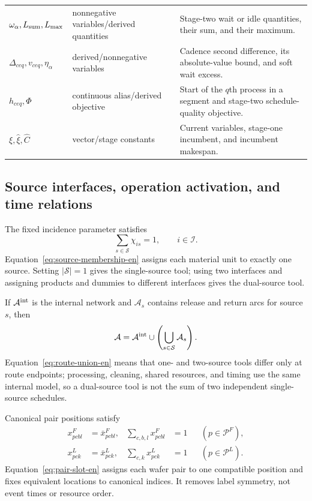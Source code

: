\documentclass[final,5p,times,twocolumn]{elsarticle}
\begin{document}
\begin{table}[t]
\begin{tabular}{p{}p{}p{}}
$\omega_\alpha,L_{\rm sum},L_{\max}$ & nonnegative variables/derived quantities & Stage-two wait or idle quantities, their sum, and their maximum.\\
$\Delta_{ceq},v_{ceq},\eta_\alpha$ & derived/nonnegative variables & Cadence second difference, its absolute-value bound, and soft wait excess.\\
$h_{ceq},\Phi$ & continuous alias/derived objective & Start of the $q$th process in a segment and stage-two schedule-quality objective.\\
$\xi,\widehat\xi,\widehat C$ & vector/stage constants & Current variables, stage-one incumbent, and incumbent makespan.\\
\bottomrule
\end{tabular}
\end{table}

\subsection{Source interfaces, operation activation, and time relations}

The fixed incidence parameter satisfies
\begin{equation}
\sum_{s\in\mathcal S}\chi_{is}=1,
\qquad i\in\mathcal I.
\label{eq:source-membership-en}
\end{equation}
Equation~\eqref{eq:source-membership-en} assigns each material unit to exactly one source. Setting $|\mathcal S|=1$ gives the single-source tool; using two interfaces and assigning products and dummies to different interfaces gives the dual-source tool.

If $\mathcal A^{\rm int}$ is the internal network and $\mathcal A_s$ contains release and return arcs for source $s$, then
\begin{equation}
\mathcal A=\mathcal A^{\rm int}\cup
\left(\bigcup_{s\in\mathcal S}\mathcal A_s\right).
\label{eq:route-union-en}
\end{equation}
Equation~\eqref{eq:route-union-en} means that one- and two-source tools differ only at route endpoints; processing, cleaning, shared resources, and timing use the same internal model, so a dual-source tool is not the sum of two independent single-source schedules.

Canonical pair positions satisfy
\begin{equation}
\begin{aligned}
x^F_{pcbl}&=\bar x^F_{pcbl}, &
\sum_{c,b,l}x^F_{pcbl}&=1 &&(p\in\mathcal P^F),\\
x^L_{pck}&=\bar x^L_{pck}, &
\sum_{c,k}x^L_{pck}&=1 &&(p\in\mathcal P^L).
\end{aligned}
\label{eq:pair-slot-en}
\end{equation}
Equation~\eqref{eq:pair-slot-en} assigns each wafer pair to one compatible position and fixes equivalent locations to canonical indices. It removes label symmetry, not event times or resource order.
\end{document}

